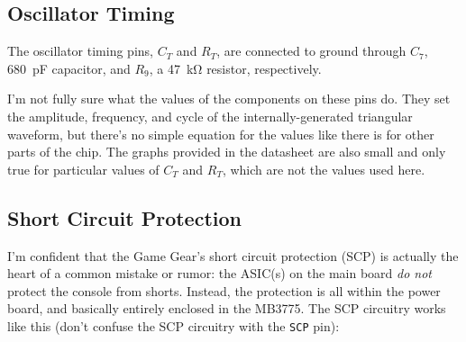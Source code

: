 \documentclass{article}
\newcommand{\chippin}{\texttt}
\newcommand{\model}{\textsf}
\begin{document}
\subsection{Oscillator Timing}
The oscillator timing pins, $C_T$ and $R_T$, are connected to ground
through $C_7$, \qty{680}{\pico\farad} capacitor, and $R_9$, a
\qty{47}{\kilo\ohm} resistor, respectively.

I'm not fully sure what the values of the components on these pins
do. They set the amplitude, frequency, and cycle of the
internally-generated triangular waveform, but there's no simple
equation for the values like there is for other parts of the chip. The
graphs provided in the datasheet are also small and only true for
particular values of $C_T$ and $R_T$, which are not the values used
here.

\subsection{Short Circuit Protection}
I'm confident that the Game Gear's short circuit protection (SCP) is
actually the heart of a common mistake or rumor: the ASIC(s) on the
main board \emph{do not} protect the console from shorts. Instead, the
protection is all within the power board, and basically entirely
enclosed in the \model{MB3775}. The SCP circuitry works like this (don't
confuse the SCP circuitry with the \chippin{SCP} pin):
\end{document}
